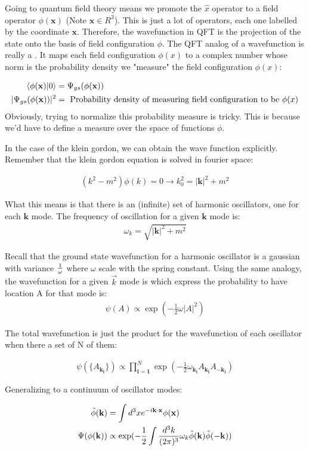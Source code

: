 \documentclass[12pt]{scrartcl}
\begin{document}
Going to quantum field theory means we promote the $\hat{x}$ operator to a field operator $\phi(\mathbf{x})$ (Note $\mathbf{x} \in R^3$).  This is just a lot of operators, each one labelled by the coordinate $\mathbf{x}$. Therefore, the wavefunction in QFT is the projection of the state onto the basis of field configuration $\phi$.  The QFT analog of a wavefunction is really a .  It maps each field configuration $\phi(x)$ to a complex number whose norm is the probability density we "measure" the field configuration $\phi(x)$:

\begin{align}
\braket{\phi(\mathbf{x}) | 0} &= \Psi_{gs}(\phi(\mathbf{x})) \\
|\Psi_{gs}(\phi(\mathbf{x}))|^2  &= 
\text{ Probability density of measuring field configuration to be } \phi(x) 
\end{align}
Obviously, trying to normalize this probability measure is tricky.  This is because we'd have to define a measure over the space of functions $\phi$.


In the case of the klein gordon, we can obtain the wave function explicitly.  Remember that the klein gordon equation is solved in fourier space:

\begin{align}
(k^2 - m^2) \phi(k) = 0 \rightarrow k_0^2 = |\mathbf{k}|^2 + m^2
\end{align}

What this means is that there is an (infinite) set of harmonic oscillators, one for each $\mathbf{k}$ mode.  The frequency of oscillation for a given $\mathbf{k}$ mode is:
\begin{align}
\omega_k = \sqrt{|\mathbf{k}|^2 + m^2}
\end{align}

Recall that the ground state wavefunction for a harmonic oscillator is a gaussian with variance ${1 \over \omega}$ where $\omega$ scale with the spring constant.  Using the same analogy, the wavefunction
for a given $\vec{k}$ mode is which express the probability to have location A for that mode is:
\begin{align}
\psi(A) \propto \exp(-  \frac12 \omega |A|^2)
\end{align}

The total wavefunction is just the product for the wavefunction of each oscillator when there a set of N of them:

\begin{align}
\psi(\{ A_{\mathbf{k_i}} \}) \propto \prod_{\mathbf{i=1}}^N \exp(- \frac12 \omega_{\mathbf{k_i}} A_{\mathbf{k_i}}
A_{-\mathbf{k_i}} ) \end{align} 

Generalizing to a continuum of oscillator modes:

\begin{align}
\tilde{\phi}(\mathbf{k}) &= \int d^3 x e^{-i \mathbf{k} \cdot \mathbf{x}} \phi(\mathbf{x}) \\
\Psi(\phi(\mathbf{k}))  & \propto \exp(- \frac12 \int {d^3 k \over (2 \pi)^3} \omega_k  \tilde{\phi}(\mathbf{k}) \tilde{\phi}(-\mathbf{k}) )
\end{align}
\end{document}
